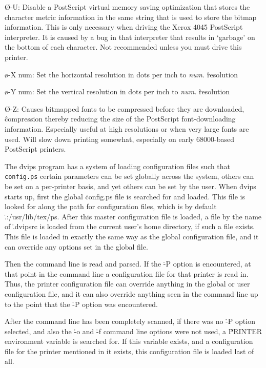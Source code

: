 {\O-U:
Disable a PostScript virtual memory saving optimization that stores the
character metric information in the same string that is used to store
the bitmap information.  This is only necessary when driving the Xerox
4045 PostScript interpreter.  It is caused by a bug in that interpreter
that results in `garbage' on the bottom of each character.  Not
recommended unless you must drive this printer.

\o-X num:
Set the horizontal resolution in dots per inch to {\it num.}
\^{resolution}

\o-Y num:
Set the vertical resolution in dots per inch to {\it num.}
\^{resolution}

\O-Z:
Causes bitmapped fonts to be compressed before they are downloaded,
\^{compression}
thereby reducing the size of the PostScript font-downloading information.
Especially useful at high resolutions or when very large fonts are
used.  Will slow down printing somewhat, especially on early 68000-based
PostScript printers.\par}


The \.{dvips} program has a system of loading configuration files such that
\^{{\tt config.ps}}
certain parameters can be set globally across the system, others can be set
on a
per-printer basis, and yet others can be set by the user.  When \.{dvips}
starts up, first the global \.{config.ps} file is searched for and loaded.
This file is looked for along the path for configuration files, which is by
default \.{.:/usr/lib/tex/ps}.
After this master configuration file is loaded, a file by the name of
\.{.dvipsrc} is loaded from the current user's home directory, if such
a file exists.  This file is loaded in exactly the same way as the global
configuration file, and it can override any options set in the global
file.

Then the command line is read and parsed.  If the \.{-P} option is
encountered, at that point in the command line a configuration file
for that printer is read in.  Thus, the printer configuration file can
override anything in the global or user configuration file, and it can
also override anything seen in the command line up to the point that the
\.{-P} option was encountered.

After the command line has been completely scanned, if there was no
\.{-P} option selected, and also the \.{-o} and \.{-f} command line
options were not used, a \.{PRINTER} environment variable is
searched for.  If this variable exists, and a configuration file for
the printer mentioned in it exists, this configuration file is
loaded last of all.

